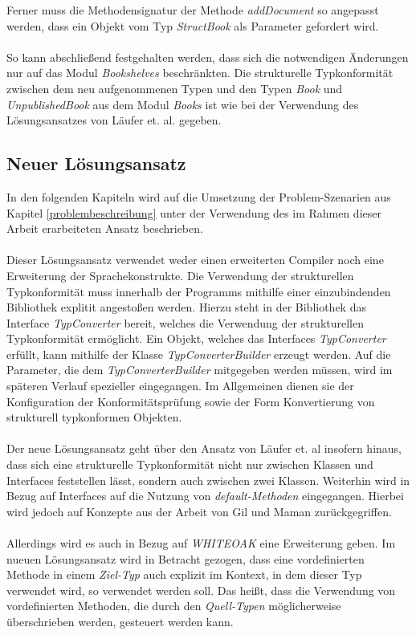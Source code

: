 \documentclass[11pt, 
ngerman,
doublespacing,
chapterinoneline, %
consistentlayout, %
]{scrartcl}
\begin{document}
Ferner muss die Methodensignatur der Methode \emph{addDocument} so angepasst werden, dass ein Objekt vom Typ \emph{StructBook} als Parameter gefordert wird.\\\\
So kann abschließend festgehalten werden, dass sich die notwendigen Änderungen nur auf das Modul \emph{Bookshelves} beschränkten. Die strukturelle Typkonformität zwischen dem neu aufgenommenen Typen und den Typen \emph{Book} und \emph{UnpublishedBook}
aus dem Modul \emph{Books} ist wie bei der Verwendung des Lösungsansatzes von Läufer et. al. \cite{structconfjava} gegeben.
\subsection{Neuer Lösungsansatz}
In den folgenden Kapiteln wird auf die Umsetzung der Problem-Szenarien aus Kapitel \ref{problembeschreibung} unter der Verwendung des im Rahmen dieser Arbeit erarbeiteten Ansatz beschrieben.\\\\
Dieser Lösungsansatz verwendet weder einen erweiterten Compiler noch eine Erweiterung der Sprachekonstrukte. Die Verwendung der strukturellen Typkonformität muss innerhalb der Programms mithilfe einer einzubindenden Bibliothek explitit angestoßen werden. Hierzu steht in der Bibliothek das Interface \emph{TypConverter} bereit, welches die Verwendung der strukturellen Typkonformität ermöglicht. Ein Objekt, welches das Interfaces \emph{TypConverter}  erfüllt, kann mithilfe der Klasse \emph{TypConverterBuilder} erzeugt werden. Auf die Parameter, die dem \emph{TypConverterBuilder} mitgegeben werden müssen, wird im späteren Verlauf spezieller eingegangen. Im Allgemeinen dienen sie der Konfiguration der Konformitätsprüfung sowie der Form Konvertierung von strukturell typkonformen Objekten.\\\\
Der neue Lösungsansatz geht über den Ansatz von Läufer et. al \cite{structconfjava} insofern hinaus, dass sich eine strukturelle Typkonformität nicht nur zwischen Klassen und Interfaces feststellen lässt, sondern auch zwischen zwei Klassen. Weiterhin wird in Bezug auf Interfaces auf die Nutzung von \emph{default-Methoden} eingegangen. Hierbei wird jedoch auf Konzepte aus der Arbeit von Gil und Maman \cite{whiteoak} zurückgegriffen.\\\\
Allerdings wird es auch in Bezug auf \emph{WHITEOAK} eine Erweiterung geben. Im nueuen Lösungsansatz wird in Betracht gezogen, dass eine vordefinierten Methode in einem \emph{Ziel-Typ} auch explizit im Kontext, in dem dieser Typ verwendet wird, so verwendet werden soll. Das heißt, dass die Verwendung von vordefinierten Methoden, die durch den \emph{Quell-Typen} möglicherweise überschrieben werden, gesteuert werden kann.
\end{document}
